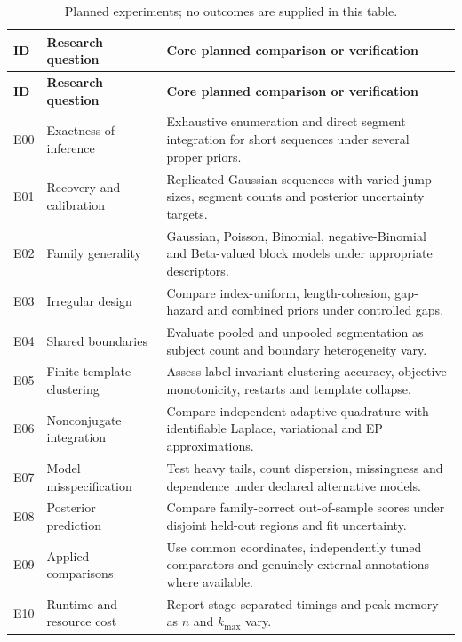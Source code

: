 \begin{longtable}{@{}p{}p{}p{}@{}}
\caption{Planned experiments; no outcomes are supplied in this table.}\label{tab:book-planned-design}\\
\toprule
\textbf{ID} & \textbf{Research question} & \textbf{Core planned comparison or verification}\\
\midrule
\endfirsthead
\toprule
\textbf{ID} & \textbf{Research question} & \textbf{Core planned comparison or verification}\\
\midrule
\endhead
E00 & Exactness of inference & Exhaustive enumeration and direct segment integration for short sequences under several proper priors.\\
E01 & Recovery and calibration & Replicated Gaussian sequences with varied jump sizes, segment counts and posterior uncertainty targets.\\
E02 & Family generality & Gaussian, Poisson, Binomial, negative-Binomial and Beta-valued block models under appropriate descriptors.\\
E03 & Irregular design & Compare index-uniform, length-cohesion, gap-hazard and combined priors under controlled gaps.\\
E04 & Shared boundaries & Evaluate pooled and unpooled segmentation as subject count and boundary heterogeneity vary.\\
E05 & Finite-template clustering & Assess label-invariant clustering accuracy, objective monotonicity, restarts and template collapse.\\
E06 & Nonconjugate integration & Compare independent adaptive quadrature with identifiable Laplace, variational and EP approximations.\\
E07 & Model misspecification & Test heavy tails, count dispersion, missingness and dependence under declared alternative models.\\
E08 & Posterior prediction & Compare family-correct out-of-sample scores under disjoint held-out regions and fit uncertainty.\\
E09 & Applied comparisons & Use common coordinates, independently tuned comparators and genuinely external annotations where available.\\
E10 & Runtime and resource cost & Report stage-separated timings and peak memory as $n$ and $k_{\max}$ vary.\\
\bottomrule
\end{longtable}

